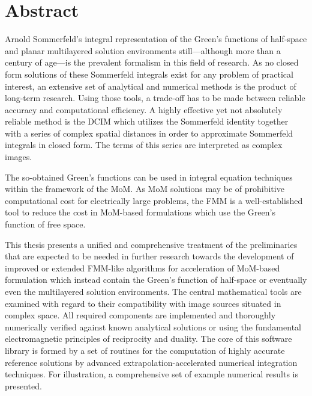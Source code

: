 \chapter*{Abstract}

Arnold Sommerfeld's integral representation of the Green's functions of
half-space and planar multilayered solution environments still---although more 
than a century of age---is the prevalent formalism in this field of research.
As no closed form solutions of these Sommerfeld integrals exist for any
problem of practical interest, an extensive set of analytical and numerical
methods is the product of long-term research.
Using those tools, a trade-off has to be made between reliable accuracy and
computational efficiency.
A highly effective yet not absolutely reliable method is the \ac{DCIM}
which utilizes the Sommerfeld identity together with a series of complex spatial
distances in order to approximate Sommerfeld integrals in closed form.
The terms of this series are interpreted as complex images.

The so-obtained Green's functions can be used in integral equation
techniques within the framework of the \ac{MoM}.
As \ac{MoM} solutions may be of prohibitive computational cost for electrically
large problems, the \ac{FMM} is a well-established tool to reduce the cost
in \ac{MoM}-based formulations which use the Green's function of free space.

This thesis presents a unified and comprehensive treatment of the preliminaries
that are expected to be needed in further research towards the development
of improved or extended \ac{FMM}-like algorithms for acceleration of 
\ac{MoM}-based formulation which instead contain the Green's function of
half-space or eventually even the multilayered solution environments.
The central mathematical tools are examined with regard to their compatibility
with image sources situated in complex space.
All required components are implemented and thoroughly numerically verified
against known analytical solutions or using the fundamental electromagnetic
principles of reciprocity and duality.
The core of this software library is formed by a set of routines for the
computation of highly accurate reference solutions by
advanced extrapolation-accelerated numerical integration techniques.
For illustration, a comprehensive set of example numerical results is presented.

\acresetall
